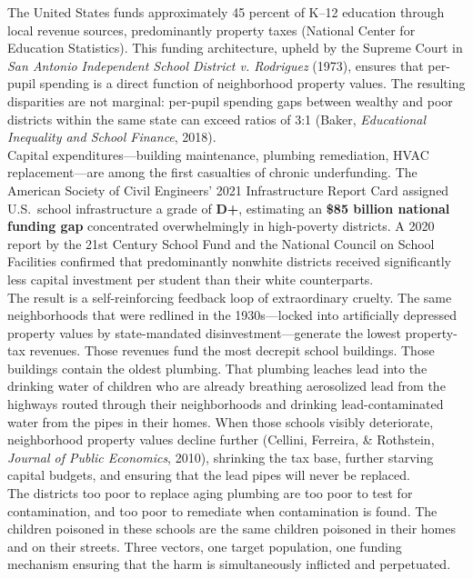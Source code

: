 \documentclass[
]{article}
\begin{document}
The United States funds approximately 45 percent of K--12 education
through local revenue sources, predominantly property taxes (National
Center for Education Statistics). This funding architecture, upheld by
the Supreme Court in \emph{San Antonio Independent School District v.
Rodriguez} (1973), ensures that per-pupil spending is a direct function
of neighborhood property values. The resulting disparities are not
marginal: per-pupil spending gaps between wealthy and poor districts
within the same state can exceed ratios of 3:1 (Baker,
\emph{Educational Inequality and School Finance}, 2018).\\
Capital expenditures---building maintenance, plumbing remediation, HVAC
replacement---are among the first casualties of chronic underfunding.
The American Society of Civil Engineers' 2021 Infrastructure Report Card
assigned U.S.\ school infrastructure a grade of \textbf{D+}, estimating
an \textbf{\$85 billion national funding gap} concentrated
overwhelmingly in high-poverty districts. A 2020 report by the 21st
Century School Fund and the National Council on School Facilities
confirmed that predominantly nonwhite districts received significantly
less capital investment per student than their white counterparts.\\
The result is a self-reinforcing feedback loop of extraordinary
cruelty. The same neighborhoods that were redlined in the 1930s---locked
into artificially depressed property values by state-mandated
disinvestment---generate the lowest property-tax revenues. Those
revenues fund the most decrepit school buildings. Those buildings contain
the oldest plumbing. That plumbing leaches lead into the drinking water
of children who are already breathing aerosolized lead from the highways
routed through their neighborhoods and drinking lead-contaminated water
from the pipes in their homes. When those schools visibly deteriorate,
neighborhood property values decline further (Cellini, Ferreira, \&
Rothstein, \emph{Journal of Public Economics}, 2010), shrinking the tax
base, further starving capital budgets, and ensuring that the lead pipes
will never be replaced.\\
The districts too poor to replace aging plumbing are too poor to test
for contamination, and too poor to remediate when contamination is
found. The children poisoned in these schools are the same children
poisoned in their homes and on their streets. Three vectors, one target
population, one funding mechanism ensuring that the harm is
simultaneously inflicted and perpetuated.
\end{document}
